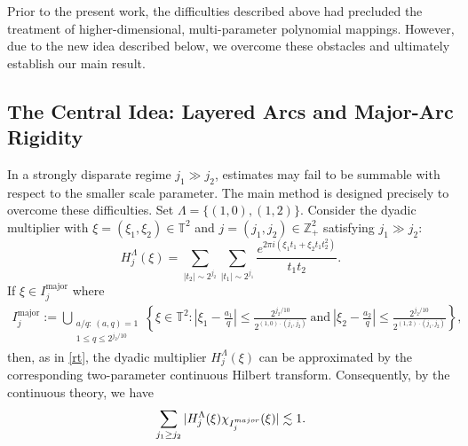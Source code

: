 \documentclass[10pt,a4paper]{amsart}
\numberwithin{equation}{section}
\begin{document}
Prior to the present work, the difficulties described above had precluded the treatment of higher-dimensional, multi-parameter polynomial mappings.
 However, due to  the new idea described below, we overcome these obstacles and ultimately establish our main result.


\subsection{The Central Idea: Layered Arcs and Major-Arc Rigidity} 
In a strongly
disparate regime $j_1\gg j_2$, estimates may fail to be summable with
respect to the smaller scale parameter.     The main method is designed precisely to overcome these difficulties.   Set $\Lambda=\{(1,0),(1,2)\}.$ Consider the dyadic multiplier with $\xi=(\xi_1,\xi_2)\in\mathbb{T}^{2}$ and $j=(j_1,j_2)\in \mathbb{Z}_{+}^{2}$ satisfying $j_1\gg j_2$:  $$H^{\Lambda}_{j}(\xi)=\sum_{|t_2|\sim 2^{j_2}}\sum_{|t_1|\sim 2^{j_1}} \frac{e^{2\pi i(\xi_1t_1+ \xi_2 t_1t_2^{2})}}{t_1t_2}.$$  
If $\xi\in I_j^{\mathrm{major}}$ where
\begin{align*}
	I_j^{\mathrm{major}}
	:=
	\bigcup_{\substack{a/q:\,(a,q)=1\\1\leq q\leq 2^{j_2/10}}}
	\left\{
	\xi\in\mathbb{T}^2:
	\left|\xi_1-\frac{a_1}{q}\right|
	\leq
	\frac{2^{j_2/10}}{2^{(1,0)\cdot(j_1,j_2)}} \ \text{and} \ \left|\xi_2-\frac{a_2}{q}\right|
	\leq
	\frac{2^{j_2/10}}{2^{(1,2)\cdot(j_1,j_2)}}
	\right\},
\end{align*}
then, as in \eqref{rt}, the dyadic multiplier $H^{\Lambda}_{j}(\xi)$  can be approximated by the corresponding two-parameter continuous Hilbert transform. Consequently,  by the continuous theory, we have  $$ \sum_{j_1\ge j_2} |H^{\Lambda}_{j}(\xi)\chi_{I_{j}^{\rm{major}}}(\xi) |\lesssim 1.$$\\
\end{document}
